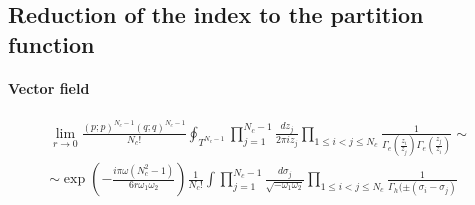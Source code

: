 \begin{appendices}
\section{Reduction of the index to the partition function}
\label{appendix:reduction_index_to_pf}
\begin{comment}
\paragraph{Vector field}
\begin{multline}
 \prod_{1 \leq i <j \leq N_c} 
  \Gamma_e\left(  {z_i \over z_j} \right)\Gamma_e\left(  {z_j \over z_i} \right) 
  \sim  \\
 \sim  \prod_{1 \leq i <j \leq N_c} 
 \exp{\left( - \frac{i \pi} {6 r \omega_1 \omega_2 }  ( (\sigma_j - \sigma_i) + (\sigma_i- \sigma_j) - 2 \omega) \right) } \, \, \Gamma_h (  \sigma_i - \sigma_j) \Gamma_h (  \sigma_j - \sigma_i) =\\
= \exp \bigg( {- \frac{i \pi} {6 r \omega_1 \omega_2 }  ( - N_c(N_c -1) \, \omega)}  \bigg)   \prod_{1 \leq i <j \leq N_c} 
 \, \Gamma_h ( \pm ( \sigma_i - \sigma_j)) 
\end{multline}

\end{comment}
\paragraph{Vector field}
\begin{multline}
\lim_{r \rightarrow 0} \frac{ (p;p)^{N_c- 1}(q;q)^{N_c- 1} }{ N_c ! }
\oint_{T^{N_c -1}} \prod_{j=1}^{N_c -1 } \frac{ d z_j}{2 \pi i z_j} \prod_{1 \leq i<j \leq N_c } \frac{1}{\Gamma_e( \frac{z_i}{z_j} )\Gamma_e( \frac{z_j}{z_i} )} \sim
\\
\sim 
\exp \left(  
- \frac{ i \pi \omega (N_c^2 -1)}{6 r \omega_1 \omega_2}
\right)
 \frac{1}{N_c !} \int \prod_{j=1}^{N_c -1 } \frac{d \sigma_j}{\sqrt{- \omega_1 \omega_2} } \prod_{1 \leq i<j \leq N_c }\frac{1}{\Gamma_h( \pm (\sigma_i - \sigma_j) }
\end{multline}



\end{appendices}
